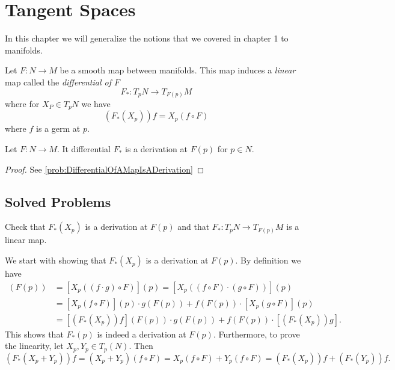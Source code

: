\chapter{Tangent Spaces}
 
In this chapter we will generalize the notions that we covered in chapter 1 to manifolds.



\begin{definition}
	Let $ F:N\to M $ be a smooth map between manifolds. This map induces a \emph{linear} map  called the \emph{differential of $ F $}
	\[ F_*: T_p N \to T_{F(p)}M \]
	where for $ X_P \in T_p N $ we have
	\[ (F_*(X_p))f = X_p(f\circ F) \]
	where $ f $ is a germ at $ p $.
\end{definition}

\begin{proposition}
	Let $ F:N\to M $. It differential $ F_* $ is a derivation at $ F(p) $ for $ p \in N $. 
\end{proposition}
\begin{proof}
	See \autoref{prob:DifferentialOfAMapIsADerivation}
\end{proof}





\section{Solved Problems}
\begin{problem}
	\label{prob:DifferentialOfAMapIsADerivation}
	Check that $ F_*(X_p) $ is a derivation at $ F(p) $ and that $ F_*: T_p N \to T_{F(p)}M  $ is a linear map.
\end{problem}
\begin{solution}
	We start with showing that $ F_*(X_p) $ is a derivation at $ F(p) $. By definition we have
	\begin{align*}
		[(F_*(X_p))(f\cdot g)](F(p)) &=  [ X_p((f\cdot g)\circ F) ](p) = [ X_p((f\circ F) \cdot (g\circ F)) ](p)\\
		&= [X_p(f\circ F)](p) \cdot g(F(p)) + f(F(p))\cdot [X_p(g\circ F)](p)\\
		&= [(F_*(X_p))f](F(p)) \cdot g(F(p)) + f(F(p))\cdot [(F_*(X_p))g].
 	\end{align*}
 	This shows that $ F_*(p) $ is indeed a derivation at $ F(p) $. Furthermore, to prove the linearity, let $ X_p, Y_p \in T_p(N) $. Then
 	\[ (F_*(X_p + Y_p))f = (X_p + Y_p)(f\circ F) = X_p(f\circ F) + Y_p(f\circ F) = (F_*(X_p)) f + (F_*(Y_p)) f. \]
\end{solution}